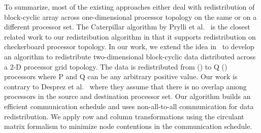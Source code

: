 \documentclass[letterpaper]{llncs}
\begin{document}
To summarize, most of the existing approaches either deal with redistribution of
block-cyclic array across one-dimensional processor topology on the same or
on a different processor set. The Caterpillar algorithm by Prylli et al.~\cite{prylli}
is the closest related work to our redistribution algorithm in that it supports
redistribution on checkerboard processor topology.
In our work,
we extend the idea in~\cite{Lim97}\cite{park} to develop an algorithm to redistribute two-dimensional block-cyclic data
distributed across a 2-D processor grid topology.
The data is redistributed from  () to Q () processors where P and Q can be any  arbitrary positive value.
Our work is contrary to  Desprez et al.~\cite{desprez98scheduling} where they assume that there is no overlap among processors in the
source and destination processor set. Our algorithm builds an efficient communication schedule and uses non-all-to-all communication
for data redistribution. 
We apply row and column transformations using the
circulant matrix formalism to minimize
node contentions in the communication schedule.
\end{document}
